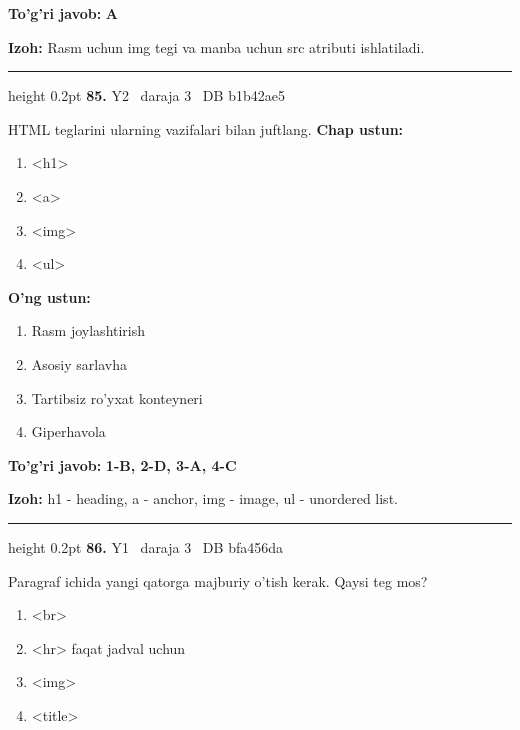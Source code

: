 \documentclass[10pt,a4paper,oneside]{article}
\begin{document}
\begin{tcolorbox}[enhanced,breakable,colback=teal!4,colframe=teal!45!black,boxrule=0.45pt,arc=1.2mm,left=2.8mm,right=2.8mm,top=2mm,bottom=2mm,before skip=2mm,after skip=2mm]
\textbf{\color{teal}To'g'ri javob:} \textbf{A}
\par\smallskip
\textbf{Izoh:} Rasm uchun img tegi va manba uchun src atributi ishlatiladi.
\end{tcolorbox}
\vspace{2mm}\hrule height 0.2pt \vspace{4mm}
\hypertarget{q85}{\textbf{\color{ink}85.}}  {\color{muted}\scriptsize Y2 \textbullet\ daraja 3 \textbullet\ DB b1b42ae5}
\par
HTML teglarini ularning vazifalari bilan juftlang.
\textbf{\footnotesize Chap ustun:}
\begin{enumerate}[label=\arabic*),leftmargin=9mm]
\item \textless{}h1\textgreater{}
\item \textless{}a\textgreater{}
\item \textless{}img\textgreater{}
\item \textless{}ul\textgreater{}
\end{enumerate}
\textbf{\footnotesize O'ng ustun:}
\begin{enumerate}[label=\Alph*),leftmargin=9mm]
\item Rasm joylashtirish
\item Asosiy sarlavha
\item Tartibsiz ro'yxat konteyneri
\item Giperhavola
\end{enumerate}
\begin{tcolorbox}[enhanced,breakable,colback=teal!4,colframe=teal!45!black,boxrule=0.45pt,arc=1.2mm,left=2.8mm,right=2.8mm,top=2mm,bottom=2mm,before skip=2mm,after skip=2mm]
\textbf{\color{teal}To'g'ri javob:} \textbf{1-B, 2-D, 3-A, 4-C}
\par\smallskip
\textbf{Izoh:} h1 - heading, a - anchor, img - image, ul - unordered list.
\end{tcolorbox}
\vspace{2mm}\hrule height 0.2pt \vspace{4mm}
\hypertarget{q86}{\textbf{\color{ink}86.}}  {\color{muted}\scriptsize Y1 \textbullet\ daraja 3 \textbullet\ DB bfa456da}
\par
Paragraf ichida yangi qatorga majburiy o'tish kerak. Qaysi teg mos?
\begin{enumerate}[label=\Alph*),leftmargin=9mm]
\item \textless{}br\textgreater{}
\item \textless{}hr\textgreater{} faqat jadval uchun
\item \textless{}img\textgreater{}
\item \textless{}title\textgreater{}
\end{enumerate}
\end{document}
